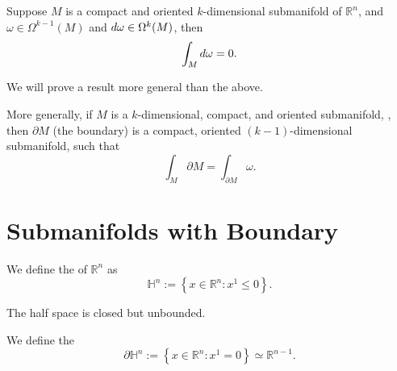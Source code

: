 \documentclass[notoc,notitlepage]{tufte-book}
\begin{document}
\begin{thm}\label{thm:stokes_theorem_first}
  Suppose $M$ is a compact and oriented $k$-dimensional submanifold of
  $\mathbb{R}^n$, and $\omega \in \Omega^{k - 1}(M)$ and $\mathop{}\!d{\omega} \in
  \Omega^k(M)$, then
  \begin{equation*}
    \int_{M} \mathop{}\!d{\omega} = 0. 
  \end{equation*}
\end{thm}

We will prove a result more general than the above.

More generally, if $M$ is a $k$-dimensional, compact, and oriented submanifold,
, then $\partial M$ (the boundary) is a compact, oriented
$(k - 1)$-dimensional submanifold, such that
\begin{equation*}
  \int_{M} \partial M = \int_{\partial M} \omega. 
\end{equation*}


\section{Submanifolds with Boundary}%
\label{sec:submanifolds_with_boundary}

\begin{defn}\label{defn:half_space}
  We define the  of $\mathbb{R}^n$ as
  \begin{equation*}
    \mathbb{H}^n := \left\{ x \in \mathbb{R}^n : x^1 \leq 0 \right\}.
  \end{equation*}
\end{defn}

\begin{note}
  The half space is closed but unbounded.
\end{note}

\begin{defn}\label{defn:boundary_of_the_half_space}
  We define the 
  \begin{equation*}
    \partial \mathbb{H}^n := \left\{ x \in \mathbb{R}^n : x^1 = 0 \right\}
    \simeq \mathbb{R}^{n - 1}.
  \end{equation*}
\end{defn}
\end{document}
